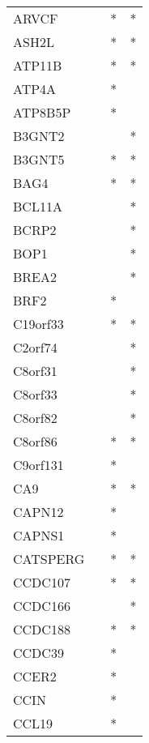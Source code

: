 \begin{longtable}{lccc}
ARVCF        &           &   * &       * \\
ASH2L        &           &   * &       * \\
ATP11B       &           &   * &       * \\
ATP4A        &           &   * &         \\
ATP8B5P      &           &   * &         \\
B3GNT2       &           &     &       * \\
B3GNT5       &           &   * &       * \\
BAG4         &           &   * &       * \\
BCL11A       &           &     &       * \\
BCRP2        &           &     &       * \\
BOP1         &           &     &       * \\
BREA2        &           &     &       * \\
BRF2         &           &   * &         \\
C19orf33     &           &   * &       * \\
C2orf74      &           &     &       * \\
C8orf31      &           &     &       * \\
C8orf33      &           &     &       * \\
C8orf82      &           &     &       * \\
C8orf86      &           &   * &       * \\
C9orf131     &           &   * &         \\
CA9          &           &   * &       * \\
CAPN12       &           &   * &         \\
CAPNS1       &           &   * &         \\
CATSPERG     &           &   * &       * \\
CCDC107      &           &   * &       * \\
CCDC166      &           &     &       * \\
CCDC188      &           &   * &       * \\
CCDC39       &           &   * &         \\
CCER2        &           &   * &         \\
CCIN         &           &   * &         \\
CCL19        &           &   * &         \\

\end{longtable}
